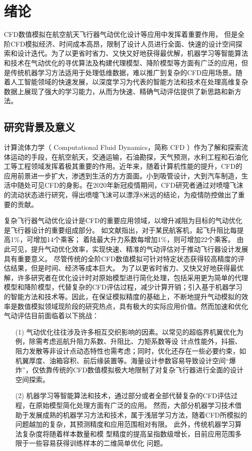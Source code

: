 \chapter{绪论}
CFD数值模拟在航空航天飞行器气动优化设计等应用中发挥着重要作用，
但是全阶CFD模拟经济、时间成本高昂，限制了设计人员进行全面、快速的设计空间探索和设计迭代。为了以更省时省力、又快又好地获得最优解，机器学习等智能算法和技术在气动优化的寻优算法及构建代理模型、降阶模型等方面有广泛的应用，但是传统机器学习方法适用于处理低维数据，难以推广到复杂的CFD应用场景。随着人工智能领域的快速发展，以深度学习为代表的智能方法和技术在处理高维复杂数据上展现了强大的学习能力，从而为快速、精确气动评估提供了新思路和新方法。



\section{研究背景及意义}
计算流体力学（ Computational Fluid Dynamics，简称 CFD ）作为了解和探索流体运动的手段，在航空航天，交通运输，石油勘探，天气预测，水利工程和石油化工等工程领域发挥着极其重要的作用。近年来，随着计算机性能的提升，CFD的应用前景进一步扩大，渗透到生活的方方面面。小到吸管设计，大到汽车制造，生活中随处可见CFD的身影。在2020年新冠疫情期间，CFD研究者通过对喷嚏飞沫的流动状态进行研究，得出喷嚏飞沫可以漂浮8米远的结论，为疫情防控做出了重要的贡献\cite{JAMA-喷嚏}。

复杂飞行器气动优化设计是CFD的重要应用领域，以增升减阻为目标的气动优化是飞行器设计的重要组成部分。
如文献\cite{增升减阻ep}指出，对于某民航客机，起飞升阻比每提高1\%，可增加14个乘客；
着陆最大升力系数每增加1\%，则可增加22个乘客。
由此可见，提升气动优化效率，实现快速、精准的气动评估对于推动飞行器设计发展具有重要意义。
尽管传统的全阶CFD数值模拟可针对特定状态获得较高精度的评估结果，但是时间、经济等成本巨大。
为了以更省时省力、又快又好地获得最优解，许多研究者在优化设计时对原始模型进行简化处理，包括采用更为简单的代理模型\cite{代理模型}和降阶模型\cite{降阶模型}，代替复杂的CFD评估过程，减少计算开销；引入基于机器学习的智能方法和技术等。因此，在保证模拟精度的基础上，不断地提升气动模拟的效率是数值模拟领域现阶段的研究热点，具有极大的实际应用价值。然而加速和优化气动评估目前面临着以下挑战：

\vspace{-0.2cm}
\begin{itemize}
	\item[(1)] 气动优化往往涉及许多相互交织影响的因素。以常见的超临界机翼优化为例，除需考虑巡航升阻力系数、升阻比、力矩系数等设
	计点性能外，抖振、阻力发散等非设计点动态特性也需考虑；同时，优化还存在一些必要约束，如机翼厚度、油箱容积、前后缘装置等。海量设计参数容易导致设计空间“爆炸”，仅依靠传统的CFD数值模拟极大地限制了对复杂飞行器进行全面的设计空间探索。
	\item[(2)] 机器学习等智能算法和技术，通过部分或者全部代替复杂的CFD评估过程，在原始模型简化处理方面有广泛的应用。
	然而，大部分机器学习技术借助于发展成熟的机器学习方法和技术，属于浅层学习方法，随着CFD所模拟的问题越加的复杂，其预测精度和应用范围相对有限。
	此外，传统机器学习算法复杂度将随着样本数量和模
	型精度的提高呈指数级增长，目前应用范围多限于一些容易获得训练样本的二维简单优化
	问题。

\end{itemize}

